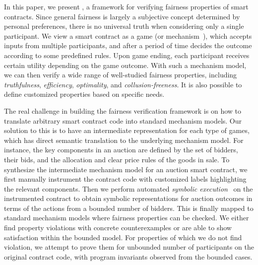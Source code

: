 
In this paper, we present \faircon, a framework for verifying fairness properties of smart contracts.
Since general fairness is largely a subjective concept determined by personal preferences, there is
no universal truth when considering only a single participant.
We view a smart contract as a game (or mechanism~\cite{jackson2014mechanism,nisan2001algorithmic}),
which accepts inputs from multiple participants, and after a period of time decides the outcome
according to some predefined rules.
Upon game ending, each participant receives certain utility depending on the game outcome.
With such a mechanism model, we can then verify a wide range of well-studied fairness properties,
including \emph{truthfulness}, \emph{efficiency}, \emph{optimality}, and \emph{collusion-freeness}.
It is also possible to define customized properties based on specific needs.

The real challenge in building the fairness verification framework is on how to translate arbitrary
smart contract code into standard mechanism models.
Our solution to this is to have an intermediate representation for each type of games, which has
direct semantic translation to the underlying mechanism model.
For instance, the key components in an auction are defined by the set of bidders, their bids, and
the allocation and clear price rules of the goods in sale.
To synthesize the intermediate mechanism model for an auction smart contract, we first manually
instrument the contract code with customized labels highlighting the relevant components.
Then we perform automated \emph{symbolic execution}~\cite{king1976symbolic} on the instrumented
contract to obtain symbolic representations for auction outcomes in terms of the actions from a
bounded number of bidders.
This is finally mapped to standard mechanism models where fairness properties can be checked.
We either find property violations with concrete counterexamples or are able to show satisfaction
within the bounded model.
For properties of which we do not find violation, we attempt to prove them for unbounded number of
participants on the original contract code, with program invariants observed from the bounded cases.

